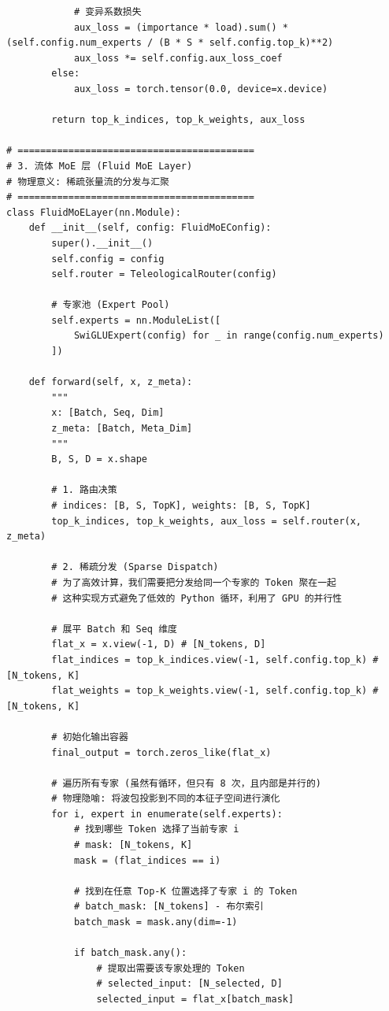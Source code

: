 \begin{lstlisting}
            # 变异系数损失
            aux_loss = (importance * load).sum() * (self.config.num_experts / (B * S * self.config.top_k)**2)
            aux_loss *= self.config.aux_loss_coef
        else:
            aux_loss = torch.tensor(0.0, device=x.device)

        return top_k_indices, top_k_weights, aux_loss

# ==========================================
# 3. 流体 MoE 层 (Fluid MoE Layer)
# 物理意义: 稀疏张量流的分发与汇聚
# ==========================================
class FluidMoELayer(nn.Module):
    def __init__(self, config: FluidMoEConfig):
        super().__init__()
        self.config = config
        self.router = TeleologicalRouter(config)

        # 专家池 (Expert Pool)
        self.experts = nn.ModuleList([
            SwiGLUExpert(config) for _ in range(config.num_experts)
        ])

    def forward(self, x, z_meta):
        """
        x: [Batch, Seq, Dim]
        z_meta: [Batch, Meta_Dim]
        """
        B, S, D = x.shape

        # 1. 路由决策
        # indices: [B, S, TopK], weights: [B, S, TopK]
        top_k_indices, top_k_weights, aux_loss = self.router(x, z_meta)

        # 2. 稀疏分发 (Sparse Dispatch)
        # 为了高效计算，我们需要把分发给同一个专家的 Token 聚在一起
        # 这种实现方式避免了低效的 Python 循环，利用了 GPU 的并行性

        # 展平 Batch 和 Seq 维度
        flat_x = x.view(-1, D) # [N_tokens, D]
        flat_indices = top_k_indices.view(-1, self.config.top_k) # [N_tokens, K]
        flat_weights = top_k_weights.view(-1, self.config.top_k) # [N_tokens, K]

        # 初始化输出容器
        final_output = torch.zeros_like(flat_x)

        # 遍历所有专家 (虽然有循环，但只有 8 次，且内部是并行的)
        # 物理隐喻: 将波包投影到不同的本征子空间进行演化
        for i, expert in enumerate(self.experts):
            # 找到哪些 Token 选择了当前专家 i
            # mask: [N_tokens, K]
            mask = (flat_indices == i)

            # 找到在任意 Top-K 位置选择了专家 i 的 Token
            # batch_mask: [N_tokens] - 布尔索引
            batch_mask = mask.any(dim=-1)

            if batch_mask.any():
                # 提取出需要该专家处理的 Token
                # selected_input: [N_selected, D]
                selected_input = flat_x[batch_mask]


\end{lstlisting}
